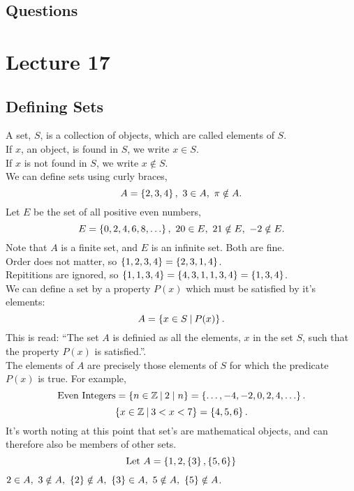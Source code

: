 \documentclass{report}
\begin{document}
\subsection*{Questions}
\qs{}{}

\newpage
\section{Lecture 17}
\subsection*{Defining Sets}
A set, $S$, is a collection of objects, which are called elements of $S$. \\
If $x$, an object, is found in $S$, we write $x\in S$. \\
If $x$ is not found in $S$, we write $x\notin S$. \\

We can define sets using curly braces, 
$$
	A = \left\lbrace 2, 3, 4 \right\rbrace,\ 3\in A,\ \pi\notin A.
$$
Let $E$ be the set of all positive even numbers,
$$
	E = \braces{0, 2, 4, 6, 8, \dots},\ 20\in E,\ 21\notin E,\ -2\notin E.
$$
Note that $A$ is a finite set, and $E$ is an infinite set. Both are fine. \\

Order does not matter, so $\left\lbrace 1, 2, 3, 4 \right\rbrace = \left\lbrace 2, 3, 1, 4 \right\rbrace$. \\
Repititions are ignored, so $\left\lbrace 1, 1, 3, 4 \right\rbrace = \left\lbrace 4, 3, 1, 1, 3, 4 \right\rbrace = \left\lbrace 1, 3, 4 \right\rbrace$. \\

We can define a set by a property $P(x)$ which must be satisfied by it's elements:
$$
	A = \left\lbrace x\in S \medspace\middle|\medspace P(x) \right\rbrace.
$$
This is read: ``The set $A$ is definied as all the elements, $x$ in the set $S$, such that the property $P(x)$ is satisfied.''. \\
The elements of $A$ are precisely those elements of $S$ for which the predicate $P(x)$ is true. For example,
$$
	\text{Even Integers} = \braces{n\in\bbz\suchthat 2\divs n} = \braces{\dots, -4, -2, 0, 2, 4, \dots}.
$$
$$
	\left\lbrace x\in\mathbb{Z}\medspace\middle|\medspace 3 < x < 7 \right\rbrace = \left\lbrace 4, 5, 6 \right\rbrace.
$$
It's worth noting at this point that set's are mathematical objects, and can therefore also be members of other sets.
$$
	\text{Let } A = \left\lbrace 1, 2, \left\lbrace 3 \right\rbrace, \left\lbrace 5,6 \right\rbrace \right\rbrace
$$
$2\in A,\ 3\notin A,\ \braces{2}\notin A,\ \braces{3}\in A,\ 5\notin A,\ \braces{5}\notin A$.
\end{document}
